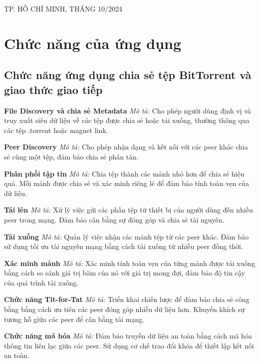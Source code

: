 \documentclass[a4paper]{article}
\begin{document}
\begin{titlepage}
\begin{center}
{\footnotesize TP. HỒ CHÍ MINH, THÁNG 10/2024}
\end{center}
\end{titlepage}

\newpage
\tableofcontents
\newpage

\section{Chức năng của ứng dụng}
\subsection{Chức năng ứng dụng chia sẻ tệp BitTorrent và giao thức giao tiếp}
    \textbf{File Discovery và chia sẻ Metadata}  
    \textit{Mô tả:} Cho phép người dùng định vị và truy xuất siêu dữ liệu về các tệp được chia sẻ hoặc tải xuống, thường thông qua các tệp .torrent hoặc magnet link.  

    \textbf{Peer Discovery}  
    \textit{Mô tả:} Cho phép nhận dạng và kết nối với các peer khác chia sẻ cùng một tệp, đảm bảo chia sẻ phân tán.  


    \textbf{Phân phối tập tin}  
    \textit{Mô tả:} Chia tệp thành các mảnh nhỏ hơn để chia sẻ hiệu quả. Mỗi mảnh được chia sẻ và xác minh riêng lẻ để đảm bảo tính toàn vẹn của dữ liệu.  
    

    \textbf{Tải lên}  
    \textit{Mô tả:} Xử lý việc gửi các phần tệp từ thiết bị của người dùng đến nhiều peer trong mạng. Đảm bảo cân bằng sự đóng góp và chia sẻ tài nguyên.  
    

    \textbf{Tải xuống}  
    \textit{Mô tả:} Quản lý việc nhận các mảnh tệp từ các peer khác. Đảm bảo sử dụng tối ưu tài nguyên mạng bằng cách tải xuống từ nhiều peer đồng thời.  
    

    \textbf{Xác minh mảnh}  
    \textit{Mô tả:} Xác minh tính toàn vẹn của từng mảnh được tải xuống bằng cách so sánh giá trị băm của nó với giá trị mong đợi, đảm bảo độ tin cậy của quá trình tải xuống.  
    

    \textbf{Chức năng Tit-for-Tat}  
    \textit{Mô tả:} Triển khai chiến lược để đảm bảo chia sẻ công bằng bằng cách ưu tiên các peer đóng góp nhiều dữ liệu hơn. Khuyến khích sự tương hỗ giữa các peer để cân bằng tải mạng.  
    

    \textbf{Chức năng mã hóa}  
    \textit{Mô tả:} Đảm bảo truyền dữ liệu an toàn bằng cách mã hóa thông tin liên lạc giữa các peer. Sử dụng cơ chế trao đổi khóa để thiết lập kết nối an toàn.  
    
\end{document}
